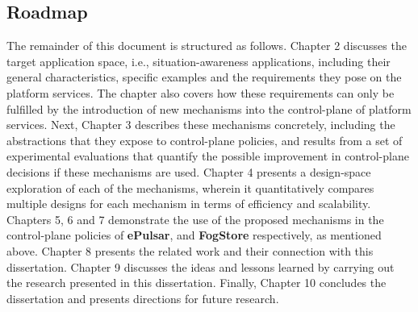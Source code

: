 \subsection{Roadmap}
The remainder of this document is structured as follows. Chapter 2 discusses the target application space, i.e., situation-awareness applications, including their general characteristics, specific examples and the requirements they pose on the platform services. The chapter also covers how these requirements can only be fulfilled by the introduction of new mechanisms into the control-plane of platform services. Next, Chapter 3 describes these mechanisms concretely, including the abstractions that they expose to control-plane policies, and results from a set of experimental evaluations that quantify the possible improvement in control-plane decisions if these mechanisms are used. Chapter 4 presents a design-space exploration of each of the mechanisms, wherein it quantitatively compares multiple designs for each mechanism in terms of efficiency and scalability. Chapters 5, 6 and 7 demonstrate the use of the proposed mechanisms in the control-plane policies of \textbf{ePulsar}, \oneedge{} and \textbf{FogStore} respectively, as mentioned above. Chapter 8 presents the related work and their connection with this dissertation. Chapter 9 discusses the ideas and lessons learned by carrying out the research presented in this dissertation. Finally, Chapter 10 concludes the dissertation and presents directions for future research.